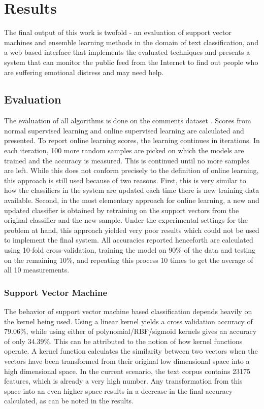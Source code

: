 \chapter{Results}
\label{chapter:Results}

The final output of this work is twofold - an evaluation of support vector machines and ensemble learning methods in the domain of text classification, and a web based interface that implements the evaluated techniques and presents a system that can monitor the public feed from the Internet to find out people who are suffering emotional distress and may need help.

\section{Evaluation}
\label{section:evaluation}
The evaluation of all algorithms is done on the comments dataset \cite{kaggle}. Scores from normal supervised learning and online supervised learning are calculated and presented. To report online learning scores, the learning continues in iterations. In each iteration, 100 more random samples are picked on which the models are trained and the accuracy is measured. This is continued until no more samples are left. While this does not conform precisely to the definition of online learning, this approach is still used because of two reasons. First, this is very similar to how the classifiers in the system are updated each time there is new training data available. Second, in the most elementary approach for online learning, a new and updated classifier is obtained by retraining on the support vectors from the original classifier and the new sample. Under the experimental settings for the problem at hand, this approach yielded very poor results which could not be used to implement the final system. All accuracies reported henceforth are calculated using 10-fold cross-validation, training the model on 90\% of the data and testing on the remaining 10\%, and repeating this process 10 times to get the average of all 10 measurements.

\subsection{Support Vector Machine}
The behavior of support vector machine based classification depends heavily on the kernel being used. Using a linear kernel yields a cross validation accuracy of 79.06\%, while using either of polynomial/RBF/sigmoid kernels gives an accuracy of only 34.39\%. This can be attributed to the notion of how kernel functions operate. A kernel function calculates the similarity between two vectors when the vectors have been transformed from their original low dimensional space into a high dimensional space. In the current scenario, the text corpus contains 23175 features, which is already a very high number. Any transformation from this space into an even higher space results in a decrease in the final accuracy calculated, as can be noted in the results.\\

